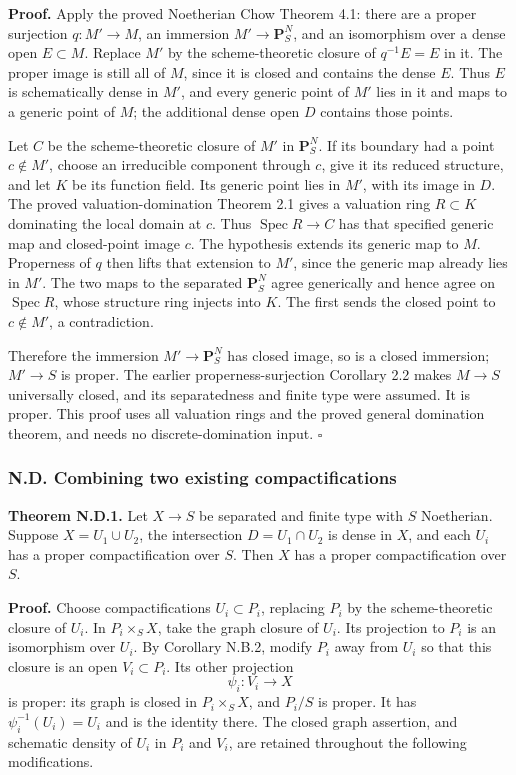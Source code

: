 \documentclass[11pt]{article}
\begin{document}
\textbf{Proof.} Apply the proved Noetherian Chow Theorem 4.1: there are
a proper surjection \(q:M'\to M\), an immersion \(M'\to\mathbf P^N_S\),
and an isomorphism over a dense open \(E\subset M\). Replace \(M'\) by
the scheme-theoretic closure of \(q^{-1}E=E\) in it. The proper image is
still all of \(M\), since it is closed and contains the dense \(E\).
Thus \(E\) is schematically dense in \(M'\), and every generic point of
\(M'\) lies in it and maps to a generic point of \(M\); the additional
dense open \(D\) contains those points.

Let \(C\) be the scheme-theoretic closure of \(M'\) in
\(\mathbf P^N_S\). If its boundary had a point \(c\notin M'\), choose an
irreducible component through \(c\), give it its reduced structure, and
let \(K\) be its function field. Its generic point lies in \(M'\), with
its image in \(D\). The proved valuation-domination Theorem 2.1 gives a
valuation ring \(R\subset K\) dominating the local domain at \(c\). Thus
\(\operatorname{Spec}R\to C\) has that specified generic map and
closed-point image \(c\). The hypothesis extends its generic map to
\(M\). Properness of \(q\) then lifts that extension to \(M'\), since
the generic map already lies in \(M'\). The two maps to the separated
\(\mathbf P^N_S\) agree generically and hence agree on
\(\operatorname{Spec}R\), whose structure ring injects into \(K\). The
first sends the closed point to \(c\notin M'\), a contradiction.

Therefore the immersion \(M'\to\mathbf P^N_S\) has closed image, so is a
closed immersion; \(M'\to S\) is proper. The earlier
properness-surjection Corollary 2.2 makes \(M\to S\) universally closed,
and its separatedness and finite type were assumed. It is proper. This
proof uses all valuation rings and the proved general domination
theorem, and needs no discrete-domination input. \(\square\)

\subsubsection{N.D. Combining two existing
compactifications}\label{n.d.-combining-two-existing-compactifications}

\textbf{Theorem N.D.1.} Let \(X\to S\) be separated and finite type with
\(S\) Noetherian. Suppose \(X=U_1\cup U_2\), the intersection
\(D=U_1\cap U_2\) is dense in \(X\), and each \(U_i\) has a proper
compactification over \(S\). Then \(X\) has a proper compactification
over \(S\).

\textbf{Proof.} Choose compactifications \(U_i\subset P_i\), replacing
\(P_i\) by the scheme-theoretic closure of \(U_i\). In
\(P_i\times_S X\), take the graph closure of \(U_i\). Its projection to
\(P_i\) is an isomorphism over \(U_i\). By Corollary N.B.2, modify
\(P_i\) away from \(U_i\) so that this closure is an open
\(V_i\subset P_i\). Its other projection \[
\psi_i:V_i\longrightarrow X
\] is proper: its graph is closed in \(P_i\times_S X\), and \(P_i/S\) is
proper. It has \(\psi_i^{-1}(U_i)=U_i\) and is the identity there. The
closed graph assertion, and schematic density of \(U_i\) in \(P_i\) and
\(V_i\), are retained throughout the following modifications.
\end{document}
